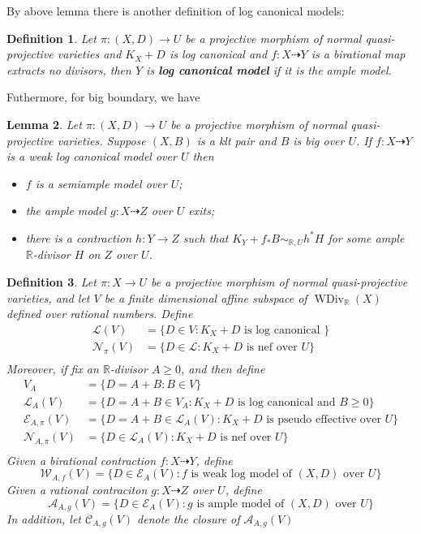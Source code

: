 \documentclass{article}
\newtheorem{defn}{Definition}[subsection]
\newtheorem{lem}[defn]{Lemma}
\begin{document}
By above lemma there is another definition of log canonical models:
\begin{defn}
  Let $ \pi:(X,D)\to U $ be a projective morphism of normal quasi-projective varieties and $ K_X+D $ is log canonical and $ f:X\dashrightarrow Y $ is a birational map extracts no divisors, then $ Y $ is \textbf{ log canonical model} if it is the ample model. 
\end{defn}
Futhermore, for big boundary, we have
\begin{lem}\cite[Lemma 3.9.3]{birkarExistenceMinimalModels2009}Let $ \pi:(X,D)\to U $ be a projective morphism of normal quasi-projective varieties. Suppose $(X,B)$ is a klt pair and  $B$ is big over $U$. If $f:X\dashrightarrow Y$ is a weak log canonical model over $U$ then
  \begin{itemize}
    \item $f$ is a semiample model over $U$;
      \item  the ample model $g:X \dashrightarrow Z$ over $U$ exits;
        \item  there is a contraction $h:Y\to Z$ such that $K_{Y}+f_*B\sim_{\mathbb{R},U} h^*H$ for some ample $\mathbb{R}$-divisor $H$ on $Z$ over $U$.   
  \end{itemize}
\end{lem}
\begin{defn}\label{polytopeofdivisor}
  \cite[Definition 1.1.4]{birkarExistenceMinimalModels2009} Let $ \pi:X\to U $ be a projective morphism of normal quasi-projective varieties, and  let $ V $ be a finite dimensional affine subspace of $ \operatorname{WDiv}_{\mathbb{R}}(X) $ defined over rational numbers. Define
  \[
    \begin{aligned}
      \mathcal{L}(V)&=\{D\in V: K_X+D \text{ is log canonical }\} \\
      \mathcal{N}_\pi(V)&=\{D\in\mathcal{L}:K_X+D \text{ is nef over } U\}\\
    \end{aligned}
  \]
  Moreover, if fix an $ \mathbb{R} $-divisor $ A\geqslant 0 $, and then define
  \[
    \begin{aligned}
      V_A&=\{D=A+B:B\in V\}\\
      \mathcal{L}_A(V)&=\{D=A+B\in V_A: K_X+D \text{ is log canonical and  } B\geqslant0 \}\\
      \mathcal{E}_{A,\pi}(V)&=\{D=A+B\in \mathcal{L}_A(V): K_X+D \text{ is pseudo effective over } U\}\\ 
      \mathcal{N}_{A,\pi}(V)&=\{D\in\mathcal{L}_A(V):K_X+D \text{ is nef over } U\}\\
    \end{aligned}
  \]
  Given a birational contraction $ f:X \dashrightarrow Y $, define
  \[ \mathcal{W}_{A,f}(V)=\{D\in \mathcal{E}_{A}(V): f \text{ is weak log model of  } (X,D) \text{ over }U\} \]
  Given a rational contraciton $g:X\dashrightarrow Z  $ over $ U $, define
  \[ \mathcal{A}_{A,g}(V)=\{D\in \mathcal{E}_{A}(V): g \text{ is ample model of  } (X,D) \text{ over }U\} \]
  In addition, let $ \mathcal{C}_{A,g}(V) $ denote the closure of $ \mathcal{A}_{A,g}(V) $
\end{defn}
\end{document}
